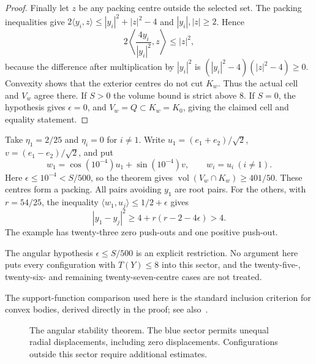 \begin{proof}
Finally let $z$ be any packing centre outside the selected set.
The packing inequalities give
$2\langle y_i,z\rangle\le|y_i|^2+|z|^2-4$ and $|y_i|,|z|\ge2$.
Hence
\[
 2\left\langle\frac{4y_i}{|y_i|^2},z\right\rangle
 \le |z|^2,
\]
because the difference after multiplication by $|y_i|^2$ is
$(|y_i|^2-4)(|z|^2-4)\ge0$.
Convexity shows that the exterior centres do not cut $K_w$.
Thus the actual cell and $V_w$ agree there. If $S>0$ the volume
bound is strict above $8$. If $S=0$, the hypothesis gives
$\epsilon=0$, and $V_w=Q\subset K_w=K_0$, giving the claimed
cell and equality statement.
\end{proof}

\begin{example}
Take $\eta_1=2/25$ and $\eta_i=0$ for $i\ne1$. Write
$u_1=(e_1+e_2)/\sqrt2$, $v=(e_1-e_2)/\sqrt2$, and put
\[
 w_1=\cos(10^{-4})u_1+\sin(10^{-4})v,\qquad w_i=u_i\ (i\ne1).
\]
Here $\epsilon\le10^{-4}<S/500$, so the theorem gives
$\operatorname{vol}(V_w\cap K_w)\ge401/50$.
These centres form a packing. All pairs avoiding $y_1$ are root pairs.
For the others, with $r=54/25$, the inequality
$\langle w_1,u_j\rangle\le1/2+\epsilon$ gives
\[
 |y_1-y_j|^2\ge4+r(r-2-4\epsilon)>4.
\]
The example has twenty-three zero push-outs and one positive push-out.
\end{example}

The angular hypothesis $\epsilon\le S/500$ is an explicit
restriction. No argument here puts every configuration with
$T(Y)\le8$ into this sector, and the twenty-five-, twenty-six-
and remaining twenty-seven-centre cases are not treated.


The support-function comparison used here is the standard inclusion criterion for convex bodies, derived directly in the proof; see also~\cite{Round26Schneider}.

\begin{figure}[tbp]
\centering
{}
\caption{The angular stability theorem. The blue sector permits unequal radial displacements, including zero displacements. Configurations outside this sector require additional estimates.}
\label{round26:fig:d4-sector}
\end{figure}